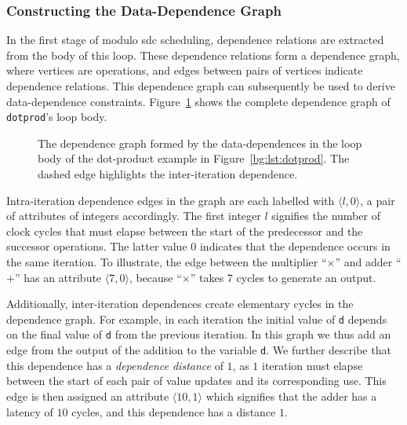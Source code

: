 \subsubsection{Constructing the Data-Dependence Graph}

In the first stage of modulo \gls{sdc} scheduling, dependence relations are
extracted from the body of this loop.  These dependence relations form a
dependence graph, where vertices are operations, and edges between pairs of
vertices indicate dependence relations.  This dependence graph can subsequently
be used to derive data-dependence constraints.  Figure~\ref{bg:fig:depgraph}
shows the complete dependence graph of \verb|dotprod|'s loop body.
\begin{figure}[ht]
    \centering
    \caption{%
        The dependence graph formed by the data-dependences in the loop body
        of the dot-product example in Figure~\ref{bg:lst:dotprod}.  The dashed
        edge highlights the inter-iteration dependence.
    }\label{bg:fig:depgraph}
\end{figure}

Intra-iteration dependence edges in the graph are each labelled with $\langle
l, 0 \rangle$, a pair of attributes of integers accordingly.  The first integer
$l$ signifies the number of clock cycles that must elapse between the start of
the predecessor and the successor operations.  The latter value $0$ indicates
that the dependence occurs in the same iteration.  To illustrate, the edge
between the multiplier ``$\times$'' and adder ``$+$'' has an attribute $\langle
7, 0 \rangle$, because ``$\times$'' takes 7 cycles to generate an output.

Additionally, inter-iteration dependences create elementary cycles in the
dependence graph.  For example, in each iteration the initial value of \verb|d|
depends on the final value of \verb|d| from the previous iteration.  In this
graph we thus add an edge from the output of the addition to the variable
\verb|d|.  We further describe that this dependence has a \emph{dependence
distance} of $1$, as $1$ iteration must elapse between the start of each pair
of value updates and its corresponding use.  This edge is then assigned
an attribute $\langle 10, 1 \rangle$ which signifies that the adder has a
latency of $10$ cycles, and this dependence has a distance $1$.

